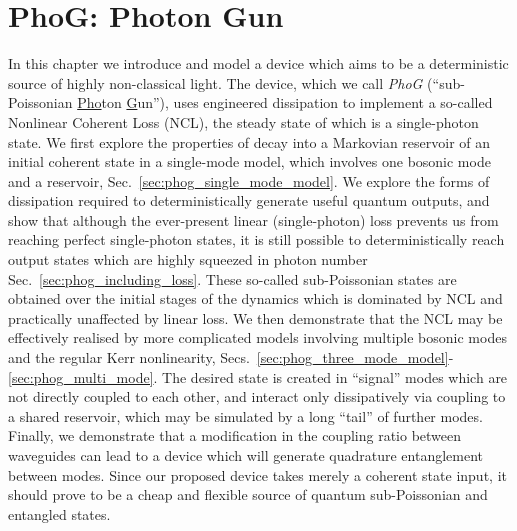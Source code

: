 

\chapter{PhoG: Photon Gun}\label{chapter:phog}



In this chapter we introduce and model a device which aims to be a deterministic source of highly non-classical light. The device, which we call \emph{PhoG} (``sub-Poissonian \underline{Pho}ton \underline{G}un''), uses engineered dissipation to implement a so-called Nonlinear Coherent Loss (NCL), the steady state of which is a single-photon state. We first explore the properties of decay into a Markovian reservoir of an initial coherent state in a single-mode model, which involves one bosonic mode and a reservoir, Sec.~\ref{sec:phog_single_mode_model}. We explore the forms of dissipation required to deterministically generate useful quantum outputs, and show that although the ever-present linear (single-photon) loss prevents us from reaching perfect single-photon states, it is still possible to deterministically reach output states which are highly squeezed in photon number Sec.~\ref{sec:phog_including_loss}. These so-called sub-Poissonian states are obtained over the initial stages of the dynamics which is dominated by NCL and practically unaffected by linear loss. We then demonstrate that the NCL may be effectively realised by more complicated models involving multiple bosonic modes and the regular Kerr nonlinearity, Secs.~\ref{sec:phog_three_mode_model}-\ref{sec:phog_multi_mode}. The desired state is created in ``signal'' modes which are not directly coupled to each other, and interact only dissipatively via coupling to a shared reservoir, which may be simulated by a long ``tail'' of further modes. Finally, we demonstrate that a modification in the coupling ratio between waveguides can lead to a device which will generate quadrature entanglement between modes. Since our proposed device takes merely a coherent state input, it should prove to be a cheap and flexible source of quantum sub-Poissonian and entangled states.

